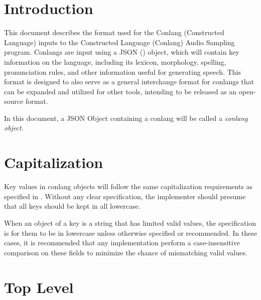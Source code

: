 \chapter{Introduction}

This document describes the format used for the Conlang (Constructed Language) inputs to the Constructed Language (Conlang) Audio Sampling program.  Conlangs are input using a JSON (\cite{JSONDataInterchange2017}) object, which will contain key information on the language, including its lexicon, morphology, spelling, pronunciation rules, and other information useful for generating speech.  This format is designed to also serve as a general interchange format for conlangs that can be expanded and utilized for other tools, intending to be released as an open-source format.

In this document, a JSON Object containing a conlang will be called a \emph{conlang object}.

\chapter{Capitalization}
Key values in conlang objects will follow the same capitalization requirements as specified in \cite{JSONDataInterchange2017}.  Without any clear specification, the implementer should presume that all keys should be kept in all lowercase.

When an object of a key is a string that has limited valid values, the specification is for them to be in lowercase unless otherwise specified or recommended.  In these cases, it is recommended that any implementation perform a case-insensitive comparison on these fields to minimize the chance of mismatching valid values.

\chapter{\label{top_level}Top Level}

